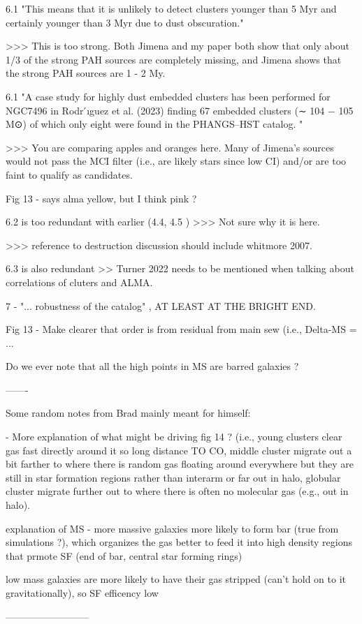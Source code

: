 6.1 "This means that it is unlikely to detect clusters younger than 5 Myr and certainly younger than 3 Myr due to dust obscuration."
 
>>> This is too strong. Both Jimena and my paper both show that only about 1/3 of the strong PAH sources are completely missing, and Jimena shows that the strong PAH sources are 1 - 2 My.
 
 
6.1 "A case study for highly dust embedded clusters has been performed for NGC7496 in Rodr ́ıguez et al. (2023) finding 67 embedded clusters (∼ 104 − 105 M⊙) of which only eight were found in the PHANGS–HST catalog. "
 
>>> You are comparing apples and oranges here. Many of Jimena's sources would not pass the MCI filter (i.e., are likely stars since low CI) and/or are too faint to qualify as candidates. 
 
 
Fig 13 - says alma yellow, but I think pink ?
 
 
6.2 is too redundant with earlier (4.4, 4.5 )  >>> Not sure why it is here.
 
 
>>> reference to destruction discussion should include whitmore 2007.
 
 
6.3 is also redundant >> Turner 2022 needs to be mentioned when talking about correlations of cluters and ALMA.
 
 
7 - "... robustness of the catalog" , AT LEAST AT THE BRIGHT END.
 
 
 
Fig 13 - Make clearer that order is from residual from main sew (i.e., Delta-MS = ...
 
 
Do we ever note that all the high points in MS are barred galaxies ?
 
-------
 
Some random notes from Brad mainly meant for himself:
 
- More explanation of what might be driving fig 14 ?  (i.e., young clusters clear gas fast directly around it so long distance TO CO, middle cluster migrate out a bit farther to where there is random gas floating around everywhere but they are still in star formation regions rather than interarm or far out in halo, globular cluster migrate further out to where there is often no molecular gas (e.g., out in halo).
 
explanation of MS - more massive galaxies more likely to form bar (true from simulations ?), which organizes the gas better to feed it into high density regions that prmote SF (end of bar, central star forming rings)
 
low mass galaxies are more likely to have their gas stripped (can't hold on to it gravitationally), so SF efficency low
 
--------------------------
 